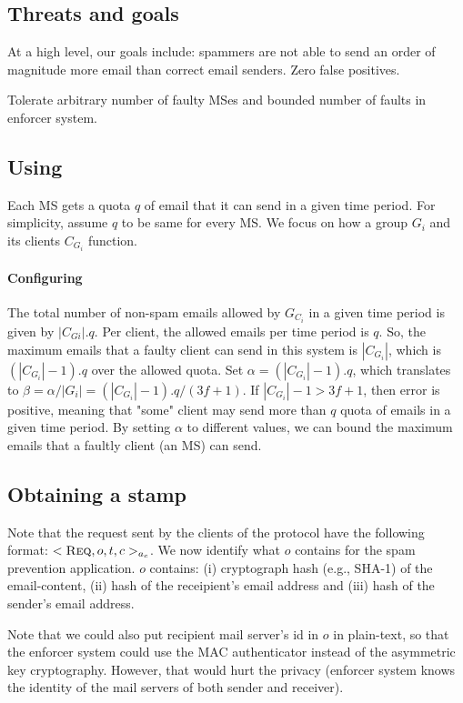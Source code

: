 \documentclass[twocolumn,10pt]{article}
\begin{document}
{\subsection{Threats and goals}
At a high level, our goals include: spammers are not able to send an order of 
magnitude more email than correct email senders. Zero false positives. 

Tolerate arbitrary number of faulty MSes and bounded number of faults in enforcer
system.

\subsection{Using \Sys}
Each MS gets a quota $q$ of email that it can send in a given time period. For simplicity,
assume $q$ to be same for every MS. We focus on how a group $G_i$ and its clients $C_{G_i}$
function.

\paragraph{Configuring \Sys}
The total number of non-spam emails allowed by $G_{C_i}$ in a given time period is given by $|C_{Gi}|.q$. Per client, the allowed emails per time period is $q$. So, the maximum emails that a faulty client can send in this system is $|C_{G_i}|$, which is $(|C_{G_i}|-1).q$ over the allowed quota. Set $\alpha=(|C_{G_i}|-1).q$, which translates to $\beta=\alpha/|G_i|=(|C_{G_i}|-1).q/(3f+1)$. If $|C_{G_i}|-1> 3f+1$, then error is positive, meaning that "some" client may send more than $q$ quota of emails in a given time period. By setting $\alpha$ to different values, we can bound the maximum emails that a faultly client (an MS) can send.

\subsection{Obtaining a stamp}
Note that the request sent by the clients of the \Sys protocol have the following format:
$<\textsc{Req}, o, t, c>_{a_c}$. We now identify what $o$ contains for the spam prevention
application. $o$ contains: (i) cryptograph hash (e.g., SHA-1) of the email-content, 
(ii) hash of the receipient's
email address and (iii) hash of the sender's email address.

Note that we could also put recipient mail server's id in $o$ in plain-text, so that the enforcer system
could use the MAC authenticator instead of the asymmetric key cryptography. However, that
would hurt the privacy (enforcer system knows the identity of the mail servers of both sender and receiver).

}
\end{document}
